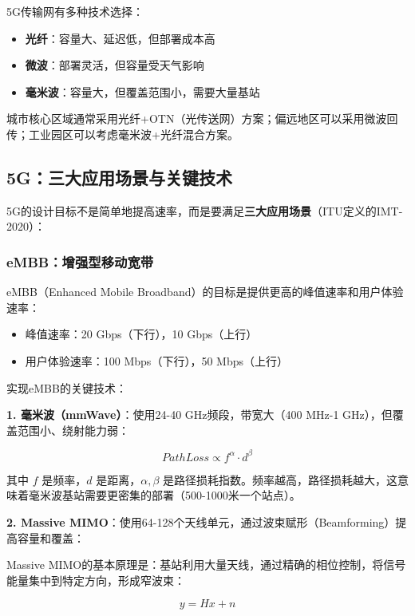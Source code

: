 5G传输网有多种技术选择：

\begin{itemize}
    \item \textbf{光纤}：容量大、延迟低，但部署成本高
    \item \textbf{微波}：部署灵活，但容量受天气影响
    \item \textbf{毫米波}：容量大，但覆盖范围小，需要大量基站
\end{itemize}

城市核心区域通常采用光纤+OTN（光传送网）方案；偏远地区可以采用微波回传；工业园区可以考虑毫米波+光纤混合方案。

\subsection{5G：三大应用场景与关键技术}

5G的设计目标不是简单地提高速率，而是要满足\textbf{三大应用场景}（ITU定义的IMT-2020）：

\subsubsection{eMBB：增强型移动宽带}

eMBB（Enhanced Mobile Broadband）的目标是提供更高的峰值速率和用户体验速率：

\begin{itemize}
    \item 峰值速率：20 Gbps（下行），10 Gbps（上行）
    \item 用户体验速率：100 Mbps（下行），50 Mbps（上行）
\end{itemize}

实现eMBB的关键技术：

\textbf{1. 毫米波（mmWave）}：使用24-40 GHz频段，带宽大（400 MHz-1 GHz），但覆盖范围小、绕射能力弱：

\begin{equation}
PathLoss \propto f^{\alpha} \cdot d^{\beta}
\end{equation}

其中 $f$ 是频率，$d$ 是距离，$\alpha, \beta$ 是路径损耗指数。频率越高，路径损耗越大，这意味着毫米波基站需要更密集的部署（500-1000米一个站点）。

\textbf{2. Massive MIMO}：使用64-128个天线单元，通过波束赋形（Beamforming）提高容量和覆盖：

Massive MIMO的基本原理是：基站利用大量天线，通过精确的相位控制，将信号能量集中到特定方向，形成窄波束：

\begin{equation}
y = Hx + n
\end{equation}

